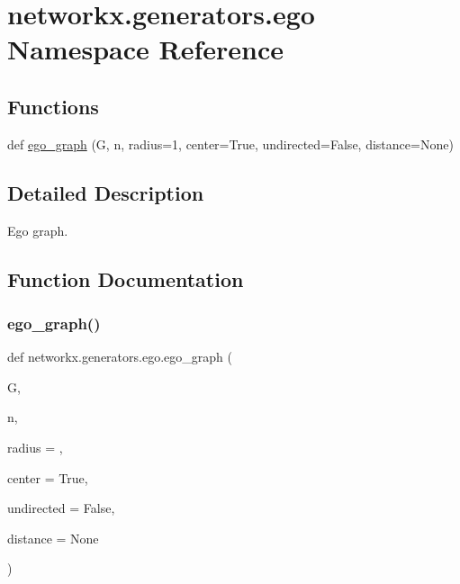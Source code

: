 \hypertarget{namespacenetworkx_1_1generators_1_1ego}{}\section{networkx.\+generators.\+ego Namespace Reference}
\label{namespacenetworkx_1_1generators_1_1ego}
\subsection*{Functions}
\begin{DoxyCompactItemize}
\item 
def \hyperlink{namespacenetworkx_1_1generators_1_1ego_aa37070299f6ed14983b1546eade3cbcd}{ego\+\_\+graph} (G, n, radius=1, center=True, undirected=False, distance=None)
\end{DoxyCompactItemize}


\subsection{Detailed Description}
\begin{DoxyVerb}Ego graph.
\end{DoxyVerb}
 

\subsection{Function Documentation}
\mbox{\label{namespacenetworkx_1_1generators_1_1ego_aa37070299f6ed14983b1546eade3cbcd}} 
\subsubsection{\texorpdfstring{ego\+\_\+graph()}{ego\_graph()}}
{\footnotesize\ttfamily def networkx.\+generators.\+ego.\+ego\+\_\+graph (\begin{DoxyParamCaption}\item[{}]{G,  }\item[{}]{n,  }\item[{}]{radius = {},  }\item[{}]{center = {\ttfamily True},  }\item[{}]{undirected = {\ttfamily False},  }\item[{}]{distance = {\ttfamily None} }\end{DoxyParamCaption})}

